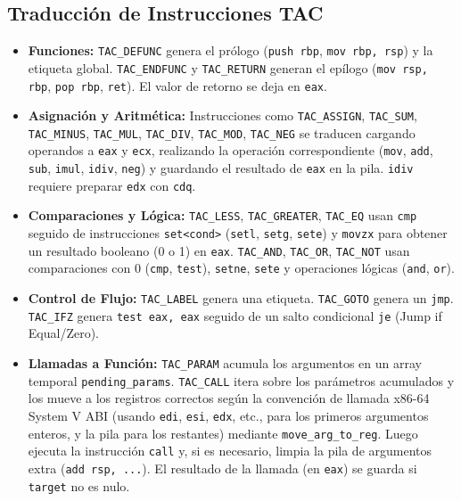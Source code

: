 \documentclass[12pt,a4paper]{article}
\begin{document}
\subsection{Traducción de Instrucciones TAC}
\begin{itemize}
    \item \textbf{Funciones:} \texttt{TAC\_DEFUNC} genera el prólogo (\texttt{push rbp}, \texttt{mov rbp, rsp}) y la etiqueta global. \texttt{TAC\_ENDFUNC} y \texttt{TAC\_RETURN} generan el epílogo (\texttt{mov rsp, rbp}, \texttt{pop rbp}, \texttt{ret}). El valor de retorno se deja en \texttt{eax}.
    \item \textbf{Asignación y Aritmética:} Instrucciones como \texttt{TAC\_ASSIGN}, \texttt{TAC\_SUM}, \texttt{TAC\_MINUS}, \texttt{TAC\_MUL}, \texttt{TAC\_DIV}, \texttt{TAC\_MOD}, \texttt{TAC\_NEG} se traducen cargando operandos a \texttt{eax} y \texttt{ecx}, realizando la operación correspondiente (\texttt{mov}, \texttt{add}, \texttt{sub}, \texttt{imul}, \texttt{idiv}, \texttt{neg}) y guardando el resultado de \texttt{eax} en la pila. \texttt{idiv} requiere preparar \texttt{edx} con \texttt{cdq}.
    \item \textbf{Comparaciones y Lógica:} \texttt{TAC\_LESS}, \texttt{TAC\_GREATER}, \texttt{TAC\_EQ} usan \texttt{cmp} seguido de instrucciones \texttt{set<cond>} (\texttt{setl}, \texttt{setg}, \texttt{sete}) y \texttt{movzx} para obtener un resultado booleano (0 o 1) en \texttt{eax}. \texttt{TAC\_AND}, \texttt{TAC\_OR}, \texttt{TAC\_NOT} usan comparaciones con 0 (\texttt{cmp}, \texttt{test}), \texttt{setne}, \texttt{sete} y operaciones lógicas (\texttt{and}, \texttt{or}).
    \item \textbf{Control de Flujo:} \texttt{TAC\_LABEL} genera una etiqueta. \texttt{TAC\_GOTO} genera un \texttt{jmp}. \texttt{TAC\_IFZ} genera \texttt{test eax, eax} seguido de un salto condicional \texttt{je} (Jump if Equal/Zero).
    \item \textbf{Llamadas a Función:} \texttt{TAC\_PARAM} acumula los argumentos en un array temporal \texttt{pending\_params}. \texttt{TAC\_CALL} itera sobre los parámetros acumulados y los mueve a los registros correctos según la convención de llamada x86-64 System V ABI (usando \texttt{edi}, \texttt{esi}, \texttt{edx}, etc., para los primeros argumentos enteros, y la pila para los restantes) mediante \texttt{move\_arg\_to\_reg}. Luego ejecuta la instrucción \texttt{call} y, si es necesario, limpia la pila de argumentos extra (\texttt{add rsp, ...}). El resultado de la llamada (en \texttt{eax}) se guarda si \texttt{target} no es nulo.
\end{itemize}
\end{document}
